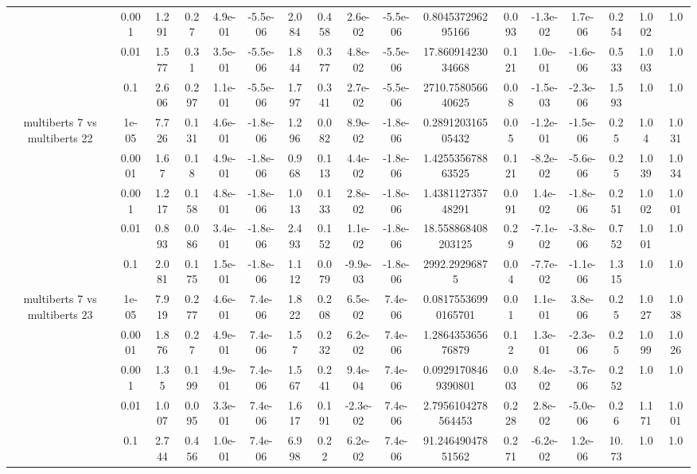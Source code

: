 \begin{tabular}{|c|c|c|c|c|c|c|c|c|c|c|c|c|c|c|c|c|}
 & 0.001 & 1.291 & 0.27 & 4.9e-01 & -5.5e-06 & 2.084 & 0.458 & 2.6e-02 & -5.5e-06 & 0.804537296295166 & 0.093 & -1.3e-02 & 1.7e-06 & 0.254 & 1.002 & 1.0 \\
 & 0.01 & 1.577 & 0.31 & 3.5e-01 & -5.5e-06 & 1.844 & 0.377 & 4.8e-02 & -5.5e-06 & 17.86091423034668 & 0.121 & 1.0e-01 & -1.6e-06 & 0.533 & 1.003 & 1.0 \\
 & 0.1 & 2.606 & 0.297 & 1.1e-01 & -5.5e-06 & 1.797 & 0.341 & 2.7e-02 & -5.5e-06 & 2710.758056640625 & 0.08 & -1.5e-03 & -2.3e-06 & 1.593 & 1.0 & 1.0 \\
\hline
\multirow{5}{*}{multiberts 7 vs multiberts 22} & 1e-05 & 7.726 & 0.131 & 4.6e-01 & -1.8e-06 & 1.296 & 0.082 & 8.9e-02 & -1.8e-06 & 0.289120316505432 & 0.05 & -1.2e-01 & -1.5e-06 & 0.25 & 1.04 & 1.031 \\
 & 0.0001 & 1.67 & 0.18 & 4.9e-01 & -1.8e-06 & 0.968 & 0.113 & 4.4e-02 & -1.8e-06 & 1.425535678863525 & 0.121 & -8.2e-02 & -5.6e-06 & 0.25 & 1.039 & 1.034 \\
 & 0.001 & 1.217 & 0.158 & 4.8e-01 & -1.8e-06 & 1.013 & 0.133 & 2.8e-02 & -1.8e-06 & 1.438112735748291 & 0.091 & 1.4e-02 & -1.8e-06 & 0.251 & 1.002 & 1.001 \\
 & 0.01 & 0.893 & 0.086 & 3.4e-01 & -1.8e-06 & 2.493 & 0.152 & 1.1e-02 & -1.8e-06 & 18.558868408203125 & 0.29 & -7.1e-02 & -3.8e-06 & 0.752 & 1.001 & 1.0 \\
 & 0.1 & 2.081 & 0.175 & 1.5e-01 & -1.8e-06 & 1.112 & 0.079 & -9.9e-03 & -1.8e-06 & 2992.29296875 & 0.04 & -7.7e-02 & -1.1e-06 & 1.315 & 1.0 & 1.0 \\
\hline
\multirow{5}{*}{multiberts 7 vs multiberts 23} & 1e-05 & 7.919 & 0.277 & 4.6e-01 & 7.4e-06 & 1.822 & 0.208 & 6.5e-02 & 7.4e-06 & 0.08175536990165701 & 0.01 & 1.1e-01 & 3.8e-06 & 0.25 & 1.027 & 1.038 \\
 & 0.0001 & 1.876 & 0.27 & 4.9e-01 & 7.4e-06 & 1.57 & 0.232 & 6.2e-02 & 7.4e-06 & 1.286435365676879 & 0.12 & 1.3e-01 & -2.3e-06 & 0.25 & 1.099 & 1.026 \\
 & 0.001 & 1.35 & 0.199 & 4.9e-01 & 7.4e-06 & 1.567 & 0.241 & 9.4e-04 & 7.4e-06 & 0.09291708469390801 & 0.003 & 8.4e-02 & -3.7e-06 & 0.252 & 1.0 & 1.0 \\
 & 0.01 & 1.007 & 0.095 & 3.3e-01 & 7.4e-06 & 1.617 & 0.191 & -2.3e-02 & 7.4e-06 & 2.7956104278564453 & 0.228 & 2.8e-02 & -5.0e-06 & 0.26 & 1.171 & 1.001 \\
 & 0.1 & 2.744 & 0.456 & 1.0e-01 & 7.4e-06 & 6.998 & 0.22 & 6.2e-02 & 7.4e-06 & 91.24649047851562 & 0.271 & -6.2e-02 & 1.2e-06 & 10.73 & 1.0 & 1.0 \\

\end{tabular}
